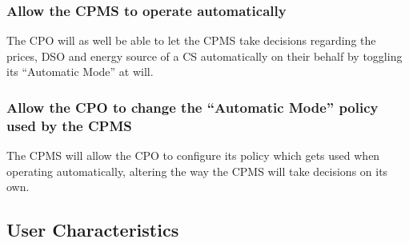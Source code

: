 \documentclass[11pt]{article}
\begin{document}
\subsubsection{Allow the CPMS to operate automatically}

The CPO will as well be able to let the CPMS take decisions regarding the prices, DSO and energy source of a CS automatically on their behalf by toggling its “Automatic Mode” at will.

\subsubsection{Allow the CPO to change the “Automatic Mode” policy used by the CPMS}

The CPMS will allow the CPO to configure its policy which gets used when operating automatically, altering the way the CPMS will take decisions on its own.

\subsection{User Characteristics}
\end{document}
